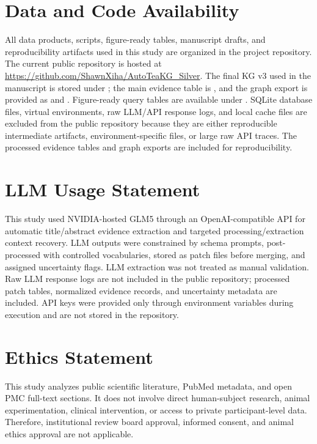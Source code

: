 \documentclass[11pt]{article}
\begin{document}
\section*{Data and Code Availability}

All data products, scripts, figure-ready tables, manuscript drafts, and reproducibility artifacts used in this study are organized in the project repository. The current public repository is hosted at \url{https://github.com/ShawnXiha/AutoTeaKG_Silver}. The final KG v3 used in the manuscript is stored under ; the main evidence table is , and the graph export is provided as  and . Figure-ready query tables are available under . SQLite database files, virtual environments, raw LLM/API response logs, and local cache files are excluded from the public repository because they are either reproducible intermediate artifacts, environment-specific files, or large raw API traces. The processed evidence tables and graph exports are included for reproducibility.

\section*{LLM Usage Statement}

This study used NVIDIA-hosted GLM5 through an OpenAI-compatible API for automatic title/abstract evidence extraction and targeted processing/extraction context recovery. LLM outputs were constrained by schema prompts, post-processed with controlled vocabularies, stored as patch files before merging, and assigned uncertainty flags. LLM extraction was not treated as manual validation. Raw LLM response logs are not included in the public repository; processed patch tables, normalized evidence records, and uncertainty metadata are included. API keys were provided only through environment variables during execution and are not stored in the repository.

\section*{Ethics Statement}

This study analyzes public scientific literature, PubMed metadata, and open PMC full-text sections. It does not involve direct human-subject research, animal experimentation, clinical intervention, or access to private participant-level data. Therefore, institutional review board approval, informed consent, and animal ethics approval are not applicable.
\end{document}
